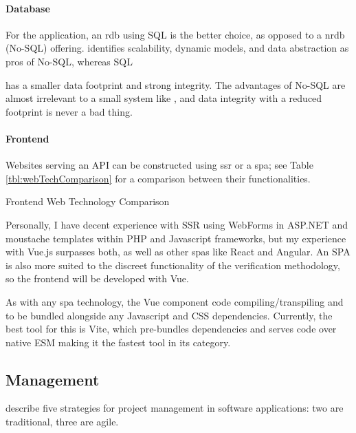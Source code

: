\paragraph{Database}
For the \projectname{} application, an \gls{rdb} using SQL
is the better choice, as opposed to a \gls{nrdb} (No-SQL)
offering.
\cite{databaseComparison} identifies scalability, dynamic
models, and data abstraction as pros of No-SQL, whereas SQL

has a smaller data footprint and strong integrity.
The advantages of No-SQL are almost irrelevant to a small
system like \projectname{}, and data integrity with a
reduced footprint is never a bad thing.


\paragraph{Frontend}
Websites serving an API can be constructed using \gls{ssr}
or a \gls{spa}; see Table \ref{tbl:webTechComparison} for a
comparison between their functionalities.

\begin{table}[h]
  \centering
  \small
  
  \caption{Frontend Web Technology Comparison}
  \label{tbl:webTechComparison}
\end{table}

Personally, I have decent experience with SSR using
WebForms in ASP.NET and moustache templates within PHP and
Javascript frameworks, but my experience with Vue.js
surpasses both, as well as other \gls{spa}s like React and
Angular.
An SPA is also more suited to the discreet functionality of
the verification methodology, so the frontend will be
developed with Vue.

As with any \gls{spa} technology, the Vue component code
compiling/transpiling and to be bundled alongside 
any Javascript and CSS dependencies. Currently, the best 
tool for this is Vite, which pre-bundles dependencies and
serves code over native ESM making it the fastest tool in
its category. 



\subsection{Management}

\cite{agileVsTraditional} describe five strategies for
project management in software applications: two are
traditional, three are agile.

